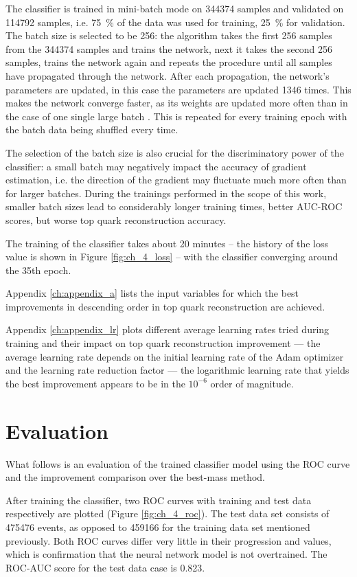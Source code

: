 The classifier is trained in mini-batch mode on \num{344374} samples and validated on \num{114792} samples, i.e. \SI{75}{\%} of the data was used for training, \SI{25}{\%} for validation. The batch size is selected to be 256: the algorithm takes the first 256 samples from the \num{344374} samples and trains the network, next it takes the second 256 samples, trains the network again and repeats the procedure until all samples have propagated through the network. After each propagation, the network's parameters are updated, in this case the parameters are updated \num{1346} times. This makes the network converge faster, as its weights are updated more often than in the case of one single large batch \cite{153535}. This is repeated for every training epoch with the batch data being shuffled every time.

The selection of the batch size is also crucial for the discriminatory power of the classifier: a small batch may negatively impact the accuracy of gradient estimation, i.e. the direction of the gradient may fluctuate much more often than for larger batches. During the trainings performed in the scope of this work, smaller batch sizes lead to considerably longer training times, better AUC-ROC scores, but worse top quark reconstruction accuracy.

The training of the classifier takes about 20 minutes -- the history of the loss value is shown in Figure \ref{fig:ch_4_loss} -- with the classifier converging around the 35th epoch.

Appendix \ref{ch:appendix_a} lists the input variables for which the best improvements in descending order in top quark reconstruction are achieved.

Appendix \ref{ch:appendix_lr} plots different average learning rates tried during training and their impact on top quark reconstruction improvement --- the average learning rate depends on the initial learning rate of the Adam optimizer and the learning rate reduction factor --- the logarithmic learning rate that yields the best improvement appears to be in the $10^{-6}$ order of magnitude.

\section{Evaluation}
\label{sec:ch-4-eval}
What follows is an evaluation of the trained classifier model using the ROC curve and the improvement comparison over the best-mass method.

After training the classifier, two ROC curves with training and test data respectively are plotted (Figure \ref{fig:ch_4_roc}). The test data set consists of \num{475476} events, as opposed to \num{459166} for the training data set mentioned previously. Both ROC curves differ very little in their progression and values, which is confirmation that the neural network model is not overtrained. The ROC-AUC score for the test data case is 0.823.

